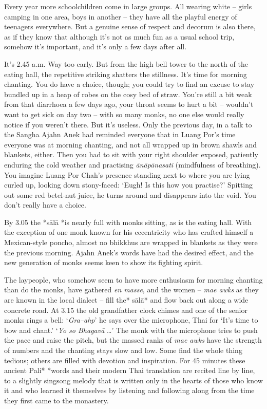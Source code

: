 Every year more schoolchildren come in large groups. All wearing white
-- girls camping in one area, boys in another -- they have all the
playful energy of teenagers everywhere. But a genuine sense of respect
and decorum is also there, as if they know that although it's not as
much fun as a usual school trip, somehow it's important, and it's only a
few days after all. 

It's 2.45 a.m. Way too early. But from the high bell tower to the north
of the eating hall, the repetitive striking shatters the stillness. It's
time for morning chanting. You do have a choice, though; you could try
to find an excuse to stay bundled up in a heap of robes on the cosy bed
of straw. You're still a bit weak from that diarrhoea a few days ago, 
your throat seems to hurt a bit -- wouldn't want to get sick on day two
-- with so many monks, no one else would really notice if you weren't
there. But it's useless. Only the previous day, in a talk to the Sangha
Ajahn Anek had reminded everyone that in Luang Por's time everyone was
at morning chanting, and not all wrapped up in brown shawls and
blankets, either. Then you had to sit with your right shoulder exposed, 
patiently enduring the cold weather and practising \emph{ānāpānasati}
 (mindfulness of breathing). You imagine Luang Por Chah's presence
standing next to where you are lying curled up, looking down
stony-faced: `Eugh! Is this how you practise?' Spitting out some red
betel-nut juice, he turns around and disappears into the void. You don't
really have a choice. 

By 3.05 the *sālā *is nearly full with monks sitting, as is the eating
hall. With the exception of one monk known for his eccentricity who has
crafted himself a Mexican-style poncho, almost no bhikkhus are wrapped
in blankets as they were the previous morning. Ajahn Anek's words have
had the desired effect, and the new generation of monks seems keen to
show its fighting spirit. 

The laypeople, who somehow seem to have more enthusiasm for morning
chanting than do the monks, have gathered \emph{en masse}, and the women
-- \emph{mae awks} as they are known in the local dialect -- fill the*
sālā* and flow back out along a wide concrete road. At 3.15 the old
grandfather clock chimes and one of the senior monks rings a bell: 
`\emph{Gra--ahp}' he says over the microphone, Thai for `It's time to
bow and chant.' `\emph{Yo so Bhagavā} \ldots{}' The monk with the
microphone tries to push the pace and raise the pitch, but the massed
ranks of \emph{mae awks} have the strength of numbers and the chanting
stays slow and low. Some find the whole thing tedious; others are filled
with devotion and inspiration. For 45 minutes these ancient Pali* *words
and their modern Thai translation are recited line by line, to a
slightly singsong melody that is written only in the hearts of those who
know it and who learned it themselves by listening and following along
from the time they first came to the monastery. 

